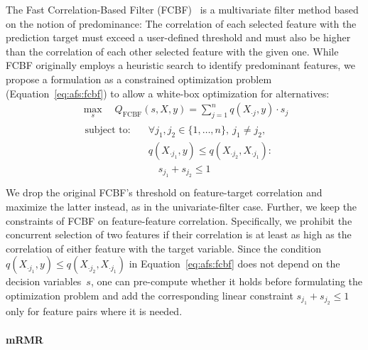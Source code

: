 \documentclass[iicol, sn-basic, Numbered]{sn-jnl} %
\theoremstyle{plain}
\theoremstyle{definition}
\begin{document}
The Fast Correlation-Based Filter (FCBF)~\cite{yu2003feature} is a multivariate filter method based on the notion of predominance:
The correlation of each selected feature with the prediction target must exceed a user-defined threshold and must also be higher than the correlation of each other selected feature with the given one.
While FCBF originally employs a heuristic search to identify predominant features, we propose a formulation as a constrained optimization problem (Equation~\ref{eq:afs:fcbf}) to allow a white-box optimization for alternatives:
%
\begin{equation}
	\begin{gathered}
		\max_s \quad Q_{\text{FCBF}}(s,X,y) = \sum_{j=1}^{n} q(X_{\cdot{}j},y) \cdot s_j \\
		\begin{aligned}
			\text{subject to:} &\quad \forall j_1, j_2 \in \{1, \dots, n\},~j_1 \neq j_2, \\
			& \quad q(X_{\cdot{}j_1},y) \leq q(X_{\cdot{}j_2}, X_{\cdot{}j_1}): \\
			& \quad\quad s_{j_1} + s_{j_2} \leq 1 \\
		\end{aligned}
	\end{gathered}
	\label{eq:afs:fcbf}
\end{equation}
%
We drop the original FCBF's threshold on feature-target correlation and maximize the latter instead, as in the univariate-filter case.
Further, we keep the constraints of FCBF on feature-feature correlation.
Specifically, we prohibit the concurrent selection of two features if their correlation is at least as high as the correlation of either feature with the target variable. 
Since the condition~$q(X_{\cdot{}j_1},y) \leq q(X_{\cdot{}j_2}, X_{\cdot{}j_1})$ in Equation~\ref{eq:afs:fcbf} does not depend on the decision variables~$s$, one can pre-compute whether it holds before formulating the optimization problem and add the corresponding linear constraint $s_{j_1} + s_{j_2} \leq 1$ only for feature pairs where it is needed.

\paragraph{mRMR}
\end{document}
